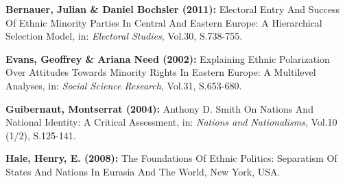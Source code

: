 \begin{compactitem}





\begin{small}


	\item [\Rectsteel] \textbf{Bernauer, Julian \& Daniel Bochsler (2011):} Electoral Entry And Success Of Ethnic Minority Parties In Central And Eastern Europe: A Hierarchical Selection Model, in: \textsl{Electoral Studies}, Vol.30, S.738-755.


	\item [\Rectsteel] \textbf{Evans, Geoffrey \& Ariana Need (2002):} Explaining Ethnic Polarization Over Attitudes Towards Minority Rights In Eastern Europe: A Multilevel Analyses, in: \textsl{Social Science Research}, Vol.31, S.653-680.


	\item [\Rectsteel] \textbf{Guibernaut, Montserrat (2004):} Anthony D. Smith On Nations And National Identity: A Critical Assessment, in: \textsl{Nations and Nationalisms}, Vol.10 (1/2), S.125-141.


	\item [\Rectsteel] \textbf{Hale, Henry, E. (2008):} The Foundations Of Ethnic Politics: Separatism Of States And Nations In Eurasia And The World, New York, USA.


\end{small}



	\end{compactitem}
